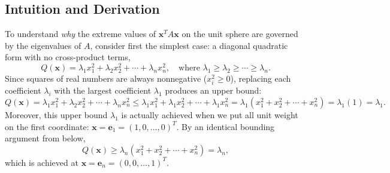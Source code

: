 \documentclass[11pt, letterpaper]{article}
\theoremstyle{definition}
\theoremstyle{remark}
\begin{document}
\subsection{Intuition and Derivation}
To understand \emph{why} the extreme values of $\mathbf{x}^T A \mathbf{x}$ on the unit sphere are governed by the eigenvalues of $A$, consider first the simplest case: a diagonal quadratic form with no cross-product terms,
\[
Q(\mathbf{x}) = \lambda_1 x_1^2 + \lambda_2 x_2^2 + \cdots + \lambda_n x_n^2, \quad \text{where } \lambda_1 \ge \lambda_2 \ge \cdots \ge \lambda_n.
\]
Since squares of real numbers are always nonnegative ($x_i^2 \ge 0$), replacing each coefficient $\lambda_i$ with the largest coefficient $\lambda_1$ produces an upper bound:
\[
Q(\mathbf{x}) = \lambda_1 x_1^2 + \lambda_2 x_2^2 + \cdots + \lambda_n x_n^2 \le \lambda_1 x_1^2 + \lambda_1 x_2^2 + \cdots + \lambda_1 x_n^2 = \lambda_1(x_1^2 + x_2^2 + \cdots + x_n^2) = \lambda_1(1) = \lambda_1.
\]
Moreover, this upper bound $\lambda_1$ is actually achieved when we put all unit weight on the first coordinate: $\mathbf{x} = \mathbf{e}_1 = (1, 0, \dots, 0)^T$. By an identical bounding argument from below,
\[
Q(\mathbf{x}) \ge \lambda_n(x_1^2 + x_2^2 + \cdots + x_n^2) = \lambda_n,
\]
which is achieved at $\mathbf{x} = \mathbf{e}_n = (0, 0, \dots, 1)^T$.
\end{document}
